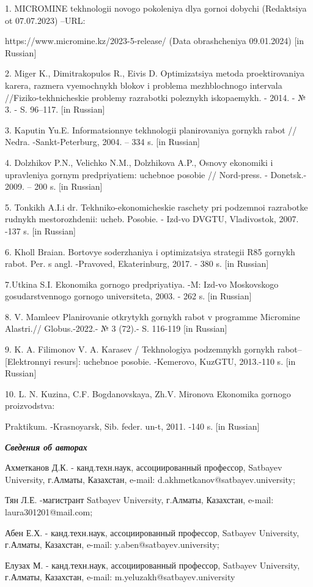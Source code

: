 \begin{noparindent}
1. MICROMINE tekhnologii novogo pokoleniya dlya gornoi dobychi
(Redaktsiya ot 07.07.2023) --URL:

https://www.micromine.kz/2023-5-release/ (Data obrashcheniya 09.01.2024)
{[}in Russian{]}

2. Miger K., Dimitrakopulos R., Eivis D. Optimizatsiya metoda
proektirovaniya kar\textquotesingle era, razmera vyemochnykh blokov i
problema mezhblochnogo intervala //Fiziko-tekhnicheskie problemy
razrabotki poleznykh iskopaemykh. - 2014. - № 3. - S. 96--117. {[}in
Russian{]}

3. Kaputin Yu.E. Informatsionnye tekhnologii planirovaniya gornykh rabot
// Nedra. -Sankt-Peterburg, 2004. -- 334 s. {[}in Russian{]}

4. Dolzhikov P.N., Velichko N.M., Dolzhikova A.P., Osnovy ekonomiki i
upravleniya gornym predpriyatiem: uchebnoe posobie // Nord-press. -
Donetsk.- 2009. -- 200 s. {[}in Russian{]}

5. Tonkikh A.I.i dr. Tekhniko-ekonomicheskie raschety pri podzemnoi
razrabotke rudnykh mestorozhdenii: ucheb. Posobie. - Izd-vo DVGTU,
Vladivostok, 2007. -137 s. {[}in Russian{]}

6. Kholl Braian. Bortovye soderzhaniya i optimizatsiya strategii R85
gornykh rabot. Per. s angl. -Pravoved, Ekaterinburg, 2017. - 380 s.
{[}in Russian{]}

7.Utkina S.I. Ekonomika gornogo predpriyatiya. -M: Izd-vo Moskovskogo
gosudarstvennogo gornogo universiteta, 2003. - 262 s. {[}in Russian{]}

8. V. Mamleev Planirovanie otkrytykh gornykh rabot v programme Micromine
Alastri.// Globus.-2022.- № 3 (72).- S. 116-119 {[}in Russian{]}

9. K. A. Filimonov V. A. Karasev / Tekhnologiya podzemnykh gornykh
rabot-- {[}Elektronnyi resurs{]}: uchebnoe posobie. -Kemerovo, KuzGTU,
2013.-110 s. {[}in Russian{]}

10. L. N. Kuzina, C.F. Bogdanovskaya, Zh.V. Mironova Ekonomika gornogo
proizvodstva:

Praktikum. -Krasnoyarsk, Sib. feder. un-t, 2011. -140 s. {[}in
Russian{]}
\end{noparindent}

\emph{{\bfseries Сведения об авторах}}

\begin{noparindent}
Ахметканов Д.К. - канд.техн.наук, ассоциированный профессор, Satbayev
University, г.Алматы, Казахстан, e-mail:
d.akhmetkanov@satbayev.university;

Тян Л.Е. -магистрант Satbayev University, г.Алматы, Казахстан, e-mail:
laura301201@mail.com;

Абен Е.Х. - канд.техн.наук, ассоциированный профессор, Satbayev
University, г.Алматы, Казахстан, e-mail: y.aben@satbayev.university;

Елузах М. - канд.техн.наук, ассоциированный профессор, Satbayev
University, г.Алматы, Казахстан, e-mail: m.yeluzakh@satbayev.university
\end{noparindent}

